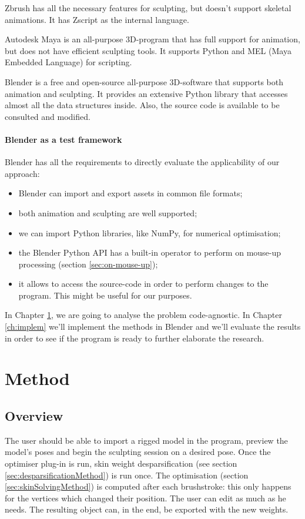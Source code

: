 \documentclass[12pt,twoside]{report}
\begin{document}
Zbrush has all the necessary features for sculpting, but doesn't support skeletal animations. It has Zscript as the internal language.

Autodesk Maya is an all-purpose 3D-program that has full support for animation, but does not have efficient sculpting tools. It supports Python and MEL (Maya Embedded Language) for scripting.

Blender is a free and open-source all-purpose 3D-software that supports both animation and sculpting. It provides an extensive Python library that accesses almost all the data structures inside. Also, the source code is available to be consulted and modified.

\subsubsection{Blender as a test framework}
Blender has all the requirements to directly evaluate the applicability of our approach:
\begin{itemize}
  \item Blender can import and export assets in common file formats;
  \item both animation and sculpting are well supported;
  \item we can import Python libraries, like NumPy, for numerical optimisation;
  \item the Blender Python API has a built-in operator to perform on mouse-up processing (section \ref{sec:on-mouse-up});
  \item it allows to access the source-code in order to perform changes to the program. This might be useful for our purposes.
\end{itemize}

In Chapter \ref{ch:method}, we are going to analyse the problem code-agnostic. In Chapter \ref{ch:implem} we'll implement the methods in Blender and we'll evaluate the results in order to see if the program is ready to further elaborate the research.

\chapter{Method}
\label{ch:method}

\section{Overview}
The user should be able to import a rigged model in the program, preview the model's poses and begin the sculpting session on a desired pose. Once the optimiser plug-in is run, skin weight desparsification (see section \ref{sec:desparsificationMethod}) is run once. The optimisation (section \ref{sec:skinSolvingMethod}) is computed after each brushstroke: this only happens for the vertices which changed their position. The user can edit as much as he needs. The resulting object can, in the end, be exported with the new weights.
\end{document}
